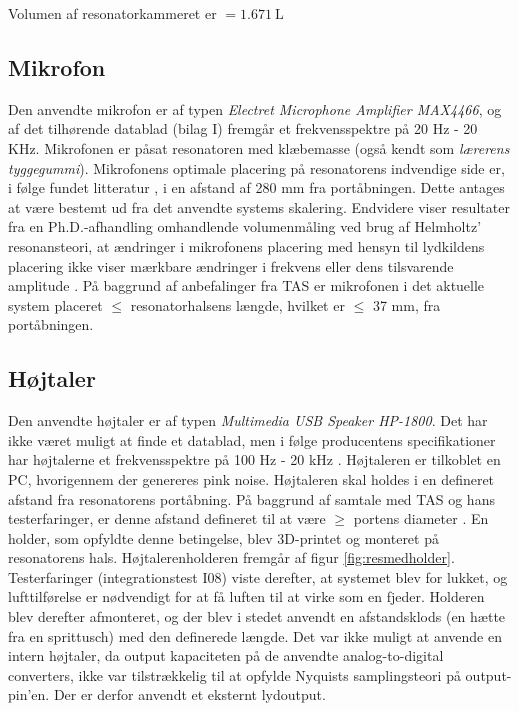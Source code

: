 Volumen af resonatorkammeret er $={\SI{1.671}{\liter}}$
 
\subsection{Mikrofon}
Den anvendte mikrofon er af typen \textit{Electret Microphone Amplifier MAX4466}, og af det tilhørende datablad (bilag I) fremgår et frekvensspektre på 20 Hz - 20 KHz. Mikrofonen er påsat resonatoren med klæbemasse (også kendt som \textit{lærerens tyggegummi}).  
Mikrofonens optimale placering på resonatorens indvendige side er, i følge fundet litteratur \citep{RefWorks:11}, i en afstand af 280 mm fra portåbningen. Dette antages at være bestemt ud fra det anvendte systems skalering. Endvidere viser resultater fra en Ph.D.-afhandling omhandlende volumenmåling ved brug af Helmholtz' resonansteori, at ændringer i mikrofonens placering med hensyn til lydkildens placering ikke viser mærkbare ændringer i frekvens eller dens tilsvarende amplitude \citep{RefWorks:22}. På baggrund af anbefalinger fra TAS er mikrofonen i det aktuelle system placeret $\leq$ resonatorhalsens længde, hvilket er $\leq$ 37 mm, fra portåbningen. 

\subsection{Højtaler}
Den anvendte højtaler er af typen \textit{Multimedia USB Speaker HP-1800}. Det har ikke været muligt at finde et datablad, men i følge producentens specifikationer har højtalerne et frekvensspektre på 100 Hz - 20 kHz \citep{RefWorks:30}. Højtaleren er tilkoblet en PC, hvorigennem der genereres pink noise. Højtaleren skal holdes i en defineret afstand fra resonatorens portåbning.  På baggrund af samtale med TAS og hans testerfaringer, er denne afstand defineret til at være $\geq$ portens diameter \citep{RefWorks:31}. En holder, som opfyldte denne betingelse, blev 3D-printet og monteret på resonatorens hals. Højtalerenholderen fremgår af figur \ref{fig:resmedholder}. Testerfaringer (integrationstest I08) viste derefter, at systemet blev for lukket, og lufttilførelse er nødvendigt for at få luften til at virke som en fjeder. Holderen blev derefter afmonteret, og der blev i stedet anvendt en afstandsklods (en hætte fra en sprittusch) med den definerede længde. Det var ikke muligt at anvende en intern højtaler, da output kapaciteten på de anvendte analog-to-digital converters, ikke var tilstrækkelig til at opfylde Nyquists samplingsteori på output-pin'en. Der er derfor anvendt et eksternt lydoutput. 

